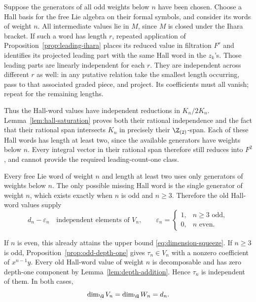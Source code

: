 Suppose the generators of all odd weights below \(n\) have been
chosen.  Choose a Hall basis for the free Lie algebra on their
formal symbols, and consider its words of weight \(n\).
All intermediate values lie in \(M\), since \(M\) is closed under
the Ihara bracket.
If such a word has length \(r\), repeated application of
Proposition~\ref{prop:leading-ihara} places its reduced value in
filtration \(F^r\) and identifies its projected leading part with
the same Hall word in the \(z_k\)'s.
Those leading parts are linearly independent for each \(r\).
They are independent across different \(r\) as well: in any
putative relation take the smallest length occurring, pass to
that associated graded piece, and project.  Its coefficients
must all vanish; repeat for the remaining lengths.

Thus the Hall-word values have independent reductions in
\(K_n/2K_n\).  Lemma~\ref{lem:hall-saturation} proves both their
rational independence and the fact that their rational span
intersects \(K_n\) in precisely their \(\Z_{(2)}\)-span.
Each of these Hall words has length at least two, since the
available generators have weights below \(n\).  Every integral
vector in their rational span therefore still reduces into
\(F^2\), and cannot provide the required leading-count-one class.

Every free Lie word of weight \(n\) and length at least two uses
only generators of weights below \(n\).  The only possible
missing Hall word is the single generator of weight \(n\), which
exists exactly when \(n\) is odd and \(n\ge3\).  Therefore the old
Hall-word values supply
\[
 d_n-\varepsilon_n
 \quad\text{independent elements of }V_n,\qquad
 \varepsilon_n=
 \begin{cases}
  1,&n\ge3\text{ odd},\\
  0,&n\text{ even}.
 \end{cases}
\]

If \(n\) is even, this already attains the upper bound
\eqref{eq:dimension-squeeze}.  If \(n\ge3\) is odd,
Proposition~\ref{prop:odd-depth-one} gives
\(\tau_n\in V_n\) with a nonzero coefficient of \(x^{n-1}y\).
Every old Hall-word value of weight \(n\) is decomposable and
has zero depth-one component by Lemma~\ref{lem:depth-addition}.
Hence \(\tau_n\) is independent of them.  In both cases,
\begin{equation}\label{eq:dimension-equality}
 \dim_\Q V_n=\dim_\Q W_n=d_n.
\end{equation}

